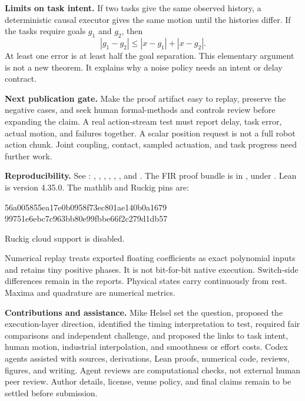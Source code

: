 \documentclass[11pt,letterpaper]{article}
\begin{document}
{\textbf{Limits on task intent.} If two tasks give the same observed history, a deterministic causal executor gives the same motion until the histories differ. If the tasks require goals $g_1$ and $g_2$, then
\[
|g_1-g_2|\leq |x-g_1|+|x-g_2|.
\]
At least one error is at least half the goal separation. This elementary argument is not a new theorem. It explains why a noise policy needs an intent or delay contract.

\textbf{Next publication gate.} Make the proof artifact easy to replay, preserve the negative cases, and seek human formal-methods and controls review before expanding the claim. A real action-stream test must report delay, task error, actual motion, and failures together. A scalar position request is not a full robot action chunk. Joint coupling, contact, sampled actuation, and task progress need further work.

{\small\raggedright\textbf{Reproducibility.} See : , , , , , , and . The FIR proof bundle is in , under . Lean is version 4.35.0. The mathlib and Ruckig pins are:\par}
\begin{center}\small\ttfamily
56a005855ea17e0b0958f73ec801ae140b0a1679\\
99751e6ebc7c963bb80e99fbbe66f2c279d1db57
\end{center}
Ruckig cloud support is disabled.

Numerical replay treats exported floating coefficients as exact polynomial inputs and retains tiny positive phases. It is not bit-for-bit native execution. Switch-side differences remain in the reports. Physical states carry continuously from rest. Maxima and quadrature are numerical metrics.

\textbf{Contributions and assistance.} Mike Helsel set the question, proposed the execution-layer direction, identified the timing interpretation to test, required fair comparisons and independent challenge, and proposed the links to task intent, human motion, industrial interpolation, and smoothness or effort costs. Codex agents assisted with sources, derivations, Lean proofs, numerical code, reviews, figures, and writing. Agent reviews are computational checks, not external human peer review. Author details, license, venue policy, and final claims remain to be settled before submission.

}
\end{document}
